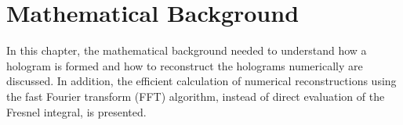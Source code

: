 %
%
%
%
%
%
%
%
%
%
%

\chapter{Mathematical Background} \label{chap:Math}
In this chapter, the mathematical background needed to understand how a
hologram is formed and how to reconstruct the holograms numerically are
discussed.
In addition, the efficient calculation of numerical reconstructions using
the fast Fourier transform (FFT) algorithm, instead of direct evaluation of the
Fresnel integral, is presented.

